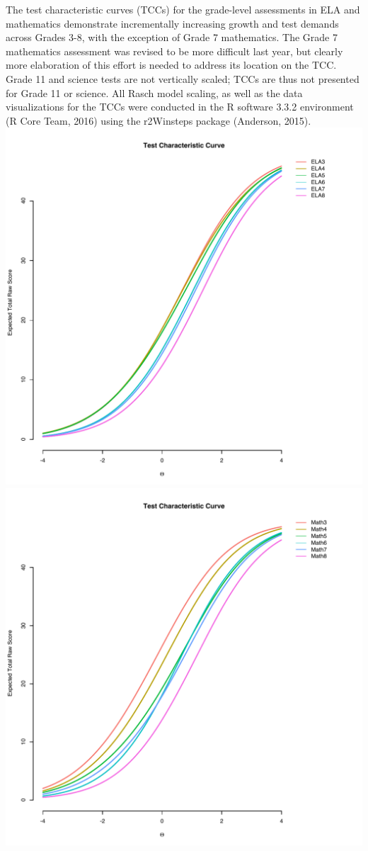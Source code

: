 \documentclass[]{article}
\begin{document}
The test characteristic curves (TCCs) for the grade-level assessments in
ELA and mathematics demonstrate incrementally increasing growth and test
demands across Grades 3-8, with the exception of Grade 7 mathematics.
The Grade 7 mathematics assessment was revised to be more difficult last
year, but clearly more elaboration of this effort is needed to address
its location on the TCC. Grade 11 and science tests are not vertically
scaled; TCCs are thus not presented for Grade 11 or science. All Rasch
model scaling, as well as the data visualizations for the TCCs were
conducted in the R software 3.3.2 environment (R Core Team, 2016) using
the r2Winsteps package (Anderson, 2015). \FloatBarrier
\includegraphics{tccs/ela_tccs.pdf} \includegraphics{tccs/math_tccs.pdf}
\clearpage
\end{document}
